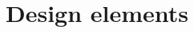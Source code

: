 	\section{Design elements} \label{s:composition-viewpoint-template:design-elements}
		\begin{comment}
			Design entities: types of constituents of a system: subsystems, components, modules; ports and (provided
			and required) interfaces; also libraries, frameworks, software repositories, catalogs, and templates.
			
			Design relationships: composition, use, and generalization. The Composition viewpoint supports the
			recording of the part-whole relationships between design entities using realization, dependency,
			aggregation, composition, and generalization relationships. Additional design relationships are required and
			provided (interfaces), and the attachment of ports to components.
			
			Design attributes: For each design entity, the viewpoint provides a reference to a detailed description via
			the identification attribute. The attribute descriptions for identification, type, purpose, function, and
			definition attribute should be utilized.
		\end{comment}	
